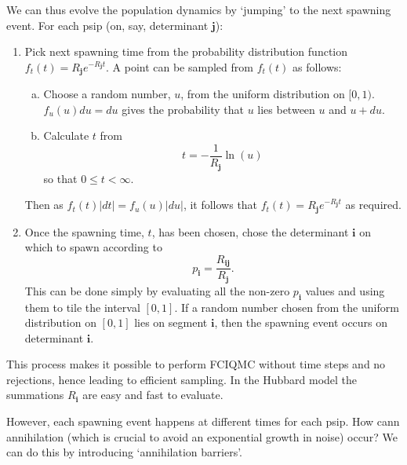 \documentclass[a4paper, 11pt]{article}
\newcommand{\bi}{\mathbf{i}}
\newcommand{\bj}{\mathbf{j}}
\begin{document}
We can thus evolve the population dynamics by `jumping' to the next spawning event.  For each psip (on, say, determinant $\bj$):
\begin{enumerate}
\item Pick next spawning time from the probability distribution function $f_t(t) = R_\bj e^{-R_\bj t}$.  A point can be sampled from $f_t(t)$ as follows:
    \begin{enumerate}[a)]
    \item Choose a random number, $u$, from the uniform distribution on $[0,1)$. $f_u(u) du = du$ gives the probability that $u$ lies between $u$ and $u+du$.
    \item Calculate $t$ from
    \begin{equation}
    t = - \frac{1}{R_\bj} \ln(u)
    \end{equation}
    so that $0 \le t < \infty$. 
    \end{enumerate}
Then as $f_t(t) |dt| = f_u(u) |du|$, it follows that $f_t(t) = R_\bj e^{-R_\bj t}$ as required.
\item Once the spawning time, $t$, has been chosen, chose the determinant $\bi$ on which to spawn according to
\begin{equation}
p_\bi = \frac{R_{\bi\bj}}{R_\bj}.
\end{equation}
This can be done simply by evaluating all the non-zero $p_\bi$ values and using them to tile the interval $[0,1]$.  If a random number chosen from the uniform distribution on $[0,1]$ lies on segment $\bi$, then the spawning event occurs on determinant $\bi$.
\end{enumerate}

This process makes it possible to perform FCIQMC without time steps and no rejections, hence leading to efficient sampling.  In the Hubbard model the summations $R_\bi$ are easy and fast to evaluate.

However, each spawning event happens at different times for each psip.  How cann annihilation (which is crucial to avoid an exponential growth in noise) occur?  We can do this by introducing `annihilation barriers'.
\end{document}
